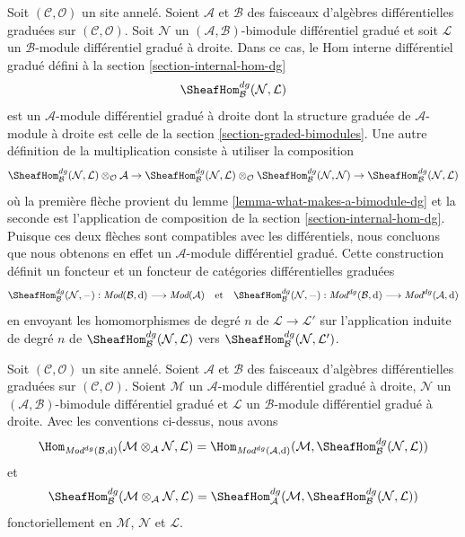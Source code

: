 \medskip\noindent
Soit $(\mathcal{C}, \mathcal{O})$ un site annelé. Soient $\mathcal{A}$ et
$\mathcal{B}$ des faisceaux d'algèbres différentielles graduées sur
$(\mathcal{C}, \mathcal{O})$. Soit $\mathcal{N}$ un
$(\mathcal{A}, \mathcal{B})$-bimodule différentiel gradué et soit
$\mathcal{L}$ un $\mathcal{B}$-module différentiel gradué à droite. Dans
ce cas, le Hom interne différentiel gradué défini à
la section \ref{section-internal-hom-dg}
$$
\SheafHom_\mathcal{B}^{dg}(\mathcal{N}, \mathcal{L})
$$ est un
$\mathcal{A}$-module différentiel gradué à droite dont la structure
graduée de $\mathcal{A}$-module à droite est celle de la section
\ref{section-graded-bimodules}. Une autre définition de la multiplication
consiste à utiliser la composition
$$
\SheafHom_\mathcal{B}^{dg}(\mathcal{N}, \mathcal{L})
\otimes_\mathcal{O} \mathcal{A}
\to
\SheafHom_\mathcal{B}^{dg}(\mathcal{N}, \mathcal{L})
\otimes_\mathcal{O} \SheafHom_\mathcal{B}^{dg}(\mathcal{N}, \mathcal{N})
\to
\SheafHom_\mathcal{B}^{dg}(\mathcal{N}, \mathcal{L})
$$ où la première
flèche provient du lemme \ref{lemma-what-makes-a-bimodule-dg} et la seconde est
l'application de composition de la section
\ref{section-internal-hom-dg}. Puisque ces deux flèches sont
compatibles avec les différentiels, nous concluons que nous obtenons
en effet un $\mathcal{A}$-module différentiel gradué.
Cette construction
définit un foncteur et un foncteur de catégories différentielles
graduées $$
\SheafHom_\mathcal{B}^{dg}(\mathcal{N},
-) : \textit{Mod}(\mathcal{B}, \text{d})
\longrightarrow
\textit{Mod}(\mathcal{A})
\quad\text{et}\quad
\SheafHom_\mathcal{B}^{dg}(\mathcal{N}, -)
: \textit{Mod}^{dg}(\mathcal{B}, \text{d})
\longrightarrow
\textit{Mod}^{dg}(\mathcal{A}, \text{d})
$$
en envoyant les homomorphismes de degré $n$ de $\mathcal{L} \to \mathcal{L}'$
sur l'application induite de degré $n$
de $\SheafHom_\mathcal{B}^{dg}(\mathcal{N}, \mathcal{L})$ vers
$\SheafHom_\mathcal{B}^{dg}(\mathcal{N}, \mathcal{L}')$.

\begin{lemma}
\label{lemma-tensor-hom-adjunction-dg}
Soit $(\mathcal{C}, \mathcal{O})$ un site annelé. Soient $\mathcal{A}$
et $\mathcal{B}$ des faisceaux d'algèbres différentielles graduées
sur $(\mathcal{C}, \mathcal{O})$. Soient $\mathcal{M}$ un
$\mathcal{A}$-module différentiel gradué à droite, $\mathcal{N}$ un
$(\mathcal{A}, \mathcal{B})$-bimodule différentiel gradué et $\mathcal{L}$ un
$\mathcal{B}$-module différentiel gradué à droite. Avec les conventions ci-dessus, nous
avons
$$
\Hom_{\textit{Mod}^{dg}(\mathcal{B}, \text{d})}(
\mathcal{M} \otimes_\mathcal{A} \mathcal{N}, \mathcal{L}) =
\Hom_{\textit{Mod}^{dg}(\mathcal{A}, \text{d})}(
\mathcal{M}, \SheafHom_\mathcal{B}^{dg}(\mathcal{N}, \mathcal{L}))
$$
et
$$
\SheafHom_\mathcal{B}^{dg}(
\mathcal{M} \otimes_\mathcal{A} \mathcal{N}, \mathcal{L}) =
\SheafHom_\mathcal{A}^{dg}(
\mathcal{M}, \SheafHom_\mathcal{B}^{dg}(\mathcal{N}, \mathcal{L}))
$$
fonctoriellement en $\mathcal{M}$, $\mathcal{N}$ et $\mathcal{L}$.
\end{lemma}

